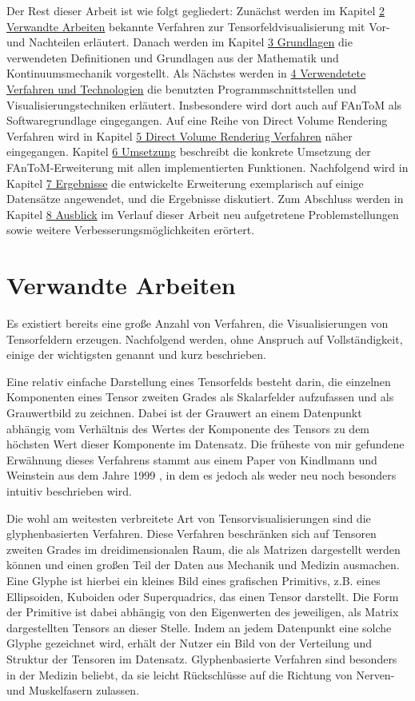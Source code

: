 \documentclass[a4paper,fontsize=12pt,toc=bib,halfparskip,ngerman]{scrartcl}
\begin{document}
Der Rest dieser Arbeit ist wie folgt gegliedert: Zun\"achst werden im Kapitel \hyperref[sec:Verwandte]{2 Verwandte Arbeiten} bekannte Verfahren zur Tensorfeldvisualisierung mit Vor- und Nachteilen erl\"autert. Danach werden im Kapitel \hyperref[sec:Grundlagen]{3 Grundlagen} die verwendeten Definitionen und Grundlagen aus der Mathematik und Kontinuumsmechanik vorgestellt. Als N\"achstes werden in \hyperref[sec:Technologien]{4 Verwendetete Verfahren und Technologien} die benutzten Programmschnittstellen und Visualisierungstechniken erl\"autert. Insbesondere wird dort auch auf FAnToM als Softwaregrundlage eingegangen. Auf eine Reihe von Direct Volume Rendering Verfahren wird in Kapitel \hyperref[sec:DVR]{5 Direct Volume Rendering Verfahren} n\"aher eingegangen. Kapitel \hyperref[sec:Umsetzung]{6 Umsetzung} beschreibt die konkrete Umsetzung der FAnToM-Erweiterung mit allen implementierten Funktionen. Nachfolgend wird in Kapitel \hyperref[sec:Ergebnisse]{7 Ergebnisse} die entwickelte Erweiterung exemplarisch auf einige Datens\"atze angewendet, und die Ergebnisse diskutiert. Zum Abschluss werden in Kapitel \hyperref[sec:Ausblick]{8 Ausblick} im Verlauf dieser Arbeit neu aufgetretene Problemstellungen sowie weitere Verbesserungsm\"oglichkeiten er\"ortert.
 
\section{Verwandte Arbeiten}
\label{sec:Verwandte}
Es existiert bereits eine gro{\ss}e Anzahl von Verfahren, die Visualisierungen von Tensorfeldern erzeugen. Nachfolgend werden, ohne Anspruch auf Vollst\"andigkeit, einige der wichtigsten genannt und kurz beschrieben.

Eine relativ einfache Darstellung eines Tensorfelds besteht darin, die einzelnen Komponenten eines Tensor zweiten Grades als Skalarfelder aufzufassen und als Grauwertbild zu zeichnen. Dabei ist der Grauwert an einem Datenpunkt abh\"angig vom Verh\"altnis des Wertes der Komponente des Tensors zu dem h\"ochsten Wert dieser Komponente im Datensatz. Die fr\"uheste von mir gefundene Erw\"ahnung dieses Verfahrens stammt aus einem Paper von Kindlmann und Weinstein aus dem Jahre 1999 \cite{kindlmann1999hue}, in dem es jedoch als weder neu noch besonders intuitiv beschrieben wird. 

Die wohl am weitesten verbreitete Art von Tensorvisualisierungen sind die glyphenbasierten Verfahren. Diese Verfahren beschr\"anken sich auf Tensoren zweiten Grades im dreidimensionalen Raum, die als Matrizen dargestellt werden k\"onnen und einen gro{\ss}en Teil der Daten aus Mechanik und Medizin ausmachen. Eine Glyphe ist hierbei ein kleines Bild eines grafischen Primitivs, z.B. eines Ellipsoiden, Kuboiden oder Superquadrics\cite{kindlmann2004superquadric}, das einen Tensor darstellt. Die Form der Primitive ist dabei abh\"angig von den Eigenwerten des jeweiligen, als Matrix dargestellten Tensors an dieser Stelle. Indem an jedem Datenpunkt eine solche Glyphe gezeichnet wird, erh\"alt der Nutzer ein Bild von der Verteilung und Struktur der Tensoren im Datensatz. Glyphenbasierte Verfahren sind besonders in der Medizin beliebt, da sie leicht R\"uckschl\"usse auf die Richtung von Nerven- und Muskelfasern zulassen.
\end{document}
